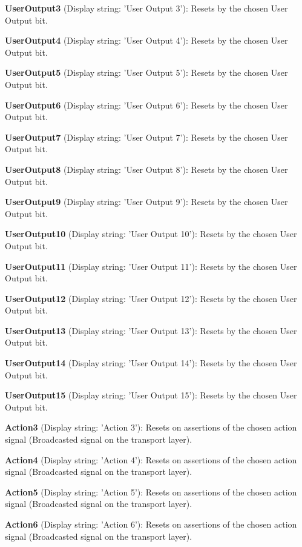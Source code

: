 \begin{DoxyItemize}
\item {\bfseries User\+Output3} (Display string\+: 'User Output 3')\+: Resets by the chosen User Output bit.
\item {\bfseries User\+Output4} (Display string\+: 'User Output 4')\+: Resets by the chosen User Output bit.
\item {\bfseries User\+Output5} (Display string\+: 'User Output 5')\+: Resets by the chosen User Output bit.
\item {\bfseries User\+Output6} (Display string\+: 'User Output 6')\+: Resets by the chosen User Output bit.
\item {\bfseries User\+Output7} (Display string\+: 'User Output 7')\+: Resets by the chosen User Output bit.
\item {\bfseries User\+Output8} (Display string\+: 'User Output 8')\+: Resets by the chosen User Output bit.
\item {\bfseries User\+Output9} (Display string\+: 'User Output 9')\+: Resets by the chosen User Output bit.
\item {\bfseries User\+Output10} (Display string\+: 'User Output 10')\+: Resets by the chosen User Output bit.
\item {\bfseries User\+Output11} (Display string\+: 'User Output 11')\+: Resets by the chosen User Output bit.
\item {\bfseries User\+Output12} (Display string\+: 'User Output 12')\+: Resets by the chosen User Output bit.
\item {\bfseries User\+Output13} (Display string\+: 'User Output 13')\+: Resets by the chosen User Output bit.
\item {\bfseries User\+Output14} (Display string\+: 'User Output 14')\+: Resets by the chosen User Output bit.
\item {\bfseries User\+Output15} (Display string\+: 'User Output 15')\+: Resets by the chosen User Output bit.
\item {\bfseries Action3} (Display string\+: 'Action 3')\+: Resets on assertions of the chosen action signal (Broadcasted signal on the transport layer).
\item {\bfseries Action4} (Display string\+: 'Action 4')\+: Resets on assertions of the chosen action signal (Broadcasted signal on the transport layer).
\item {\bfseries Action5} (Display string\+: 'Action 5')\+: Resets on assertions of the chosen action signal (Broadcasted signal on the transport layer).
\item {\bfseries Action6} (Display string\+: 'Action 6')\+: Resets on assertions of the chosen action signal (Broadcasted signal on the transport layer).

\end{DoxyItemize}
